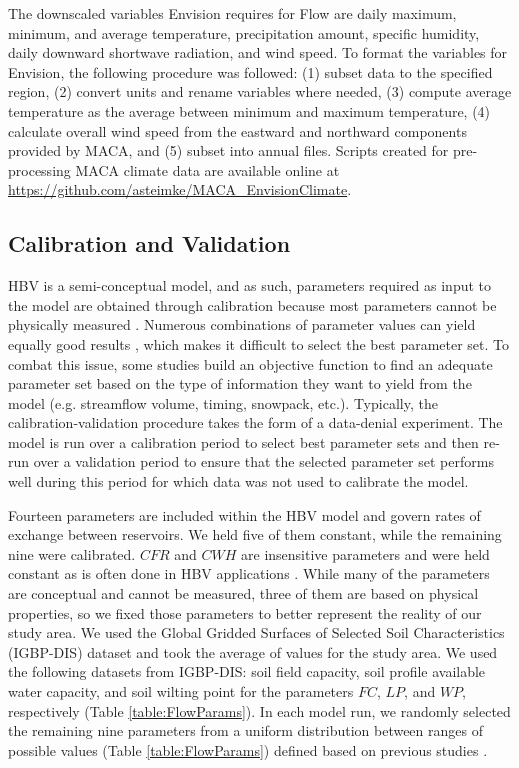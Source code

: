\documentclass[11pt,letterpaper]{article}
\begin{document}
The downscaled variables Envision requires for Flow are daily maximum, minimum, and average temperature, precipitation amount, specific humidity, daily downward shortwave radiation, and wind speed. To format the variables for Envision, the following procedure was followed: (1) subset data to the specified region, (2) convert units and rename variables where needed, (3) compute average temperature as the average between minimum and maximum temperature, (4) calculate overall wind speed from the eastward and northward components provided by MACA, and (5) subset into annual files. Scripts created for pre-processing MACA climate data are available online at \href{https://github.com/asteimke/MACA\_EnvisionClimate}{https://github.com/asteimke/MACA\_EnvisionClimate}.

\subsection{Calibration and Validation}

HBV is a semi-conceptual model, and as such, parameters required as input to the model are obtained through calibration because most parameters cannot be physically measured \citep{Bergstrom:2015ck}. Numerous combinations of parameter values can yield equally good results \citep[i.e. the equifinality issue,][]{Beven:2006wa,Gupta:2005wl}, which makes it difficult to select the best parameter set. To combat this issue, some studies \citep{Madsen:2003un,Inouye:2014ws} build an objective function to find an adequate parameter set based on the type of information they want to yield from the model (e.g. streamflow volume, timing, snowpack, etc.). Typically, the calibration-validation procedure takes the form of a data-denial experiment. The model is run over a calibration period to select best parameter sets and then re-run over a validation period to ensure that the selected parameter set performs well during this period for which data was not used to calibrate the model.

Fourteen parameters are included within the HBV model and govern rates of exchange between reservoirs. We held five of them constant, while the remaining nine were calibrated. $CFR$ and $CWH$ are insensitive parameters and were held constant as is often done in HBV applications \citep{Seibert:1997vw}. While many of the parameters are conceptual and cannot be measured, three of them are based on physical properties, so we fixed those parameters to better represent the reality of our study area. We used the Global Gridded Surfaces of Selected Soil Characteristics (IGBP-DIS) dataset \citep{Hope:1994wq} and took the average of values for the study area. We used the following datasets from IGBP-DIS: soil field capacity, soil profile available water capacity, and soil wilting point for the parameters $FC$, $LP$, and $WP$, respectively (Table \ref{table:FlowParams}). In each model run, we randomly selected the remaining nine parameters from a uniform distribution between ranges of possible values (Table \ref{table:FlowParams}) defined based on previous studies \citep{Inouye:2014ws,Han:2017tx}. 
\end{document}
